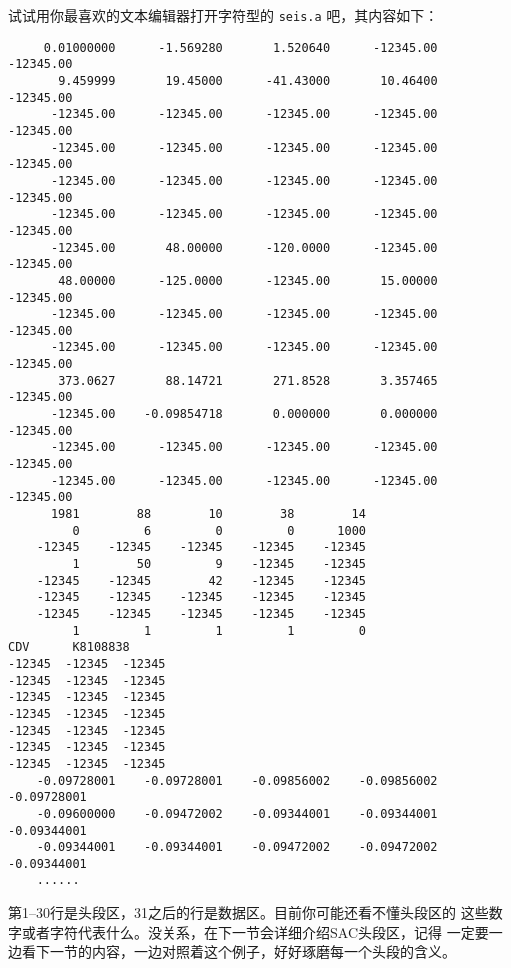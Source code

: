 试试用你最喜欢的文本编辑器打开字符型的 \texttt{seis.a} 吧，其内容如下：
\begin{verbatim}
     0.01000000      -1.569280       1.520640      -12345.00      -12345.00
       9.459999       19.45000      -41.43000       10.46400      -12345.00
      -12345.00      -12345.00      -12345.00      -12345.00      -12345.00
      -12345.00      -12345.00      -12345.00      -12345.00      -12345.00
      -12345.00      -12345.00      -12345.00      -12345.00      -12345.00
      -12345.00      -12345.00      -12345.00      -12345.00      -12345.00
      -12345.00       48.00000      -120.0000      -12345.00      -12345.00
       48.00000      -125.0000      -12345.00       15.00000      -12345.00
      -12345.00      -12345.00      -12345.00      -12345.00      -12345.00
      -12345.00      -12345.00      -12345.00      -12345.00      -12345.00
       373.0627       88.14721       271.8528       3.357465      -12345.00
      -12345.00    -0.09854718       0.000000       0.000000      -12345.00
      -12345.00      -12345.00      -12345.00      -12345.00      -12345.00
      -12345.00      -12345.00      -12345.00      -12345.00      -12345.00
      1981        88        10        38        14
         0         6         0         0      1000
    -12345    -12345    -12345    -12345    -12345
         1        50         9    -12345    -12345
    -12345    -12345        42    -12345    -12345
    -12345    -12345    -12345    -12345    -12345
    -12345    -12345    -12345    -12345    -12345
         1         1         1         1         0
CDV      K8108838
-12345  -12345  -12345
-12345  -12345  -12345
-12345  -12345  -12345
-12345  -12345  -12345
-12345  -12345  -12345
-12345  -12345  -12345
-12345  -12345  -12345
    -0.09728001    -0.09728001    -0.09856002    -0.09856002    -0.09728001
    -0.09600000    -0.09472002    -0.09344001    -0.09344001    -0.09344001
    -0.09344001    -0.09344001    -0.09472002    -0.09472002    -0.09344001
    ......
\end{verbatim}

第1--30行是头段区，31之后的行是数据区。目前你可能还看不懂头段区的
这些数字或者字符代表什么。没关系，在下一节会详细介绍SAC头段区，记得
一定要一边看下一节的内容，一边对照着这个例子，好好琢磨每一个头段的含义。
